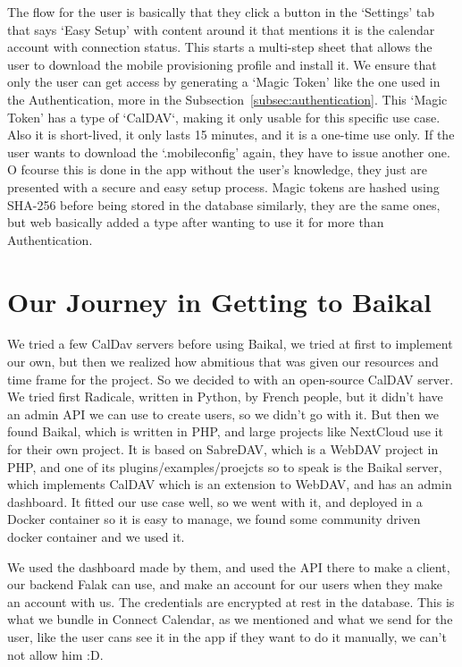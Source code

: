 The flow for the user is basically that they click a button in the `Settings' tab that says `Easy Setup' with content around it that mentions it is the calendar account with connection status. This starts a multi-step sheet that allows the user to download the mobile provisioning profile and install it. We ensure that only the user can get access by generating a `Magic Token' like the one used in the Authentication, more in the Subsection~\ref{subsec:authentication}. This `Magic Token' has a type of `CalDAV`, making it only usable for this specific use case. Also it is short-lived, it only lasts 15 minutes, and it is a one-time use only. If the user wants to download the `.mobileconfig' again, they have to issue another one. O fcourse this is done in the app without the user's knowledge, they just are presented with a secure and easy setup process. Magic tokens are hashed using SHA-256 before being stored in the database similarly, they are the same ones, but web basically added a type after wanting to use it for more than Authentication.

\section{Our Journey in Getting to Baikal}

We tried a few CalDav servers before using Baikal, we tried at first to implement our own, but then we realized how abmitious that was given our resources and time frame for the project. So we decided to with an open-source CalDAV server. We tried first Radicale, written in Python, by French people, but it didn't have an admin API we can use to create users, so we didn't go with it. But then we found Baikal, which is written in PHP, and large projects like NextCloud use it for their own project. It is based on SabreDAV, which is a WebDAV project in PHP, and one of its plugins/examples/proejcts so to speak is the Baikal server, which implements CalDAV which is an extension to WebDAV, and has an admin dashboard. It fitted our use case well, so we went with it, and deployed in a Docker container so it is easy to manage, we found some community driven docker container and we used it.

We used the dashboard made by them, and used the API there to make a client, our backend Falak can use, and make an account for our users when they make an account with us. The credentials are encrypted at rest in the database. This is what we bundle in Connect Calendar, as we mentioned and what we send for the user, like the user cans see it in the app if they want to do it manually, we can't not allow him :D.

